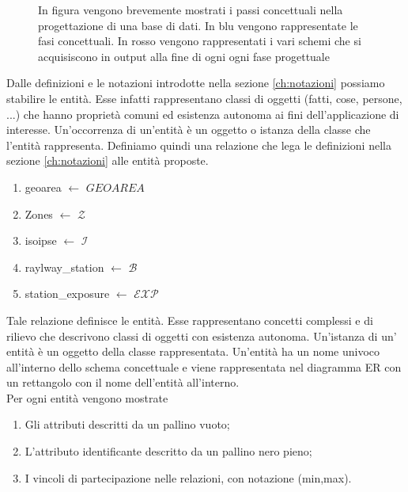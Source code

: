 \begin{figure}[H]
	\centering
{}
\caption{In figura vengono brevemente mostrati i passi concettuali nella progettazione di una base di dati. In blu vengono rappresentate le fasi concettuali. In rosso vengono rappresentati i vari schemi che si acquisiscono in output alla fine di ogni ogni fase progettuale} 
\label{fig:progettazione_basi_dati}
\end{figure}

Dalle definizioni e le notazioni introdotte nella sezione \ref{ch:notazioni} possiamo 
stabilire le entità. Esse infatti rappresentano classi di oggetti (fatti, cose, persone, ...) che hanno proprietà comuni ed esistenza autonoma ai fini dell'applicazione di interesse. Un'occorrenza di un'entità è un oggetto o istanza della classe che l'entità rappresenta.
Definiamo quindi una relazione che lega le definizioni nella sezione \ref{ch:notazioni} alle entità proposte. 
\begin{enumerate}
	\item geoarea $\leftarrow$ $GEOAREA$
	\item Zones $\leftarrow$ $\mathcal{Z}$
	\item isoipse $\leftarrow$ $\mathcal{I}$
	\item raylway\_station $\leftarrow$ $\mathcal{B}$
	\item station\_exposure $\leftarrow$ $\mathcal{EXP}$

\end{enumerate}
Tale relazione definisce le entità. Esse rappresentano concetti complessi e di rilievo che descrivono classi di oggetti con esistenza autonoma. Un'istanza di un' entità è un oggetto della classe rappresentata. Un'entità ha un nome univoco all'interno dello schema concettuale e viene rappresentata nel diagramma ER con un rettangolo con il nome dell'entità all'interno. \\
Per ogni entità vengono mostrate
\begin{enumerate}
	\item Gli attributi descritti da un pallino vuoto;
	\item L'attributo identificante descritto da un pallino nero pieno;
	\item I vincoli di partecipazione nelle relazioni, con notazione (min,max).
\end{enumerate}





